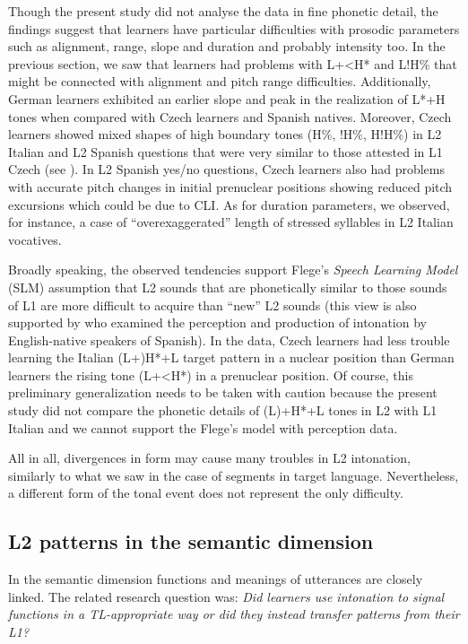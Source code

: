 Though the present study did not analyse the data in fine phonetic detail, the findings suggest that learners have particular difficulties with prosodic parameters such as alignment, range, slope and duration and probably intensity too. In the previous section, we saw that learners had problems with L+<H* and L!H\% that might be connected with alignment and pitch range difficulties. Additionally, German learners exhibited an earlier slope and peak in the realization of L*+H tones when compared with Czech learners and Spanish natives. Moreover, Czech learners showed mixed shapes of high boundary tones (H\%, !H\%, H!H\%) in L2 Italian and L2 Spanish questions that were very similar to those attested in L1 Czech (see \citealt{PeškováEtAl2018}). In L2 Spanish yes/no questions, Czech learners also had problems with accurate pitch changes in initial prenuclear positions showing reduced pitch excursions which could be due to CLI. As for duration parameters, we observed, for instance, a case of “overexaggerated” length of stressed syllables in L2 Italian vocatives.



Broadly speaking, the observed tendencies support Flege’s \textit{Speech Learning Model} (SLM) assumption that L2 sounds that are phonetically similar to those sounds of L1 are more difficult to acquire than “new” L2 sounds (this view is also supported by \citealt{Zárate-Sández2015} who examined the perception and production of intonation by English-native speakers of Spanish). In the data, Czech learners had less trouble learning the Italian (L+)H*+L target pattern in a nuclear position than German learners the rising tone (L+<H*) in a prenuclear position. Of course, this preliminary generalization needs to be taken with caution because the present study did not compare the phonetic details of (L)+H*+L tones in L2 with L1 Italian and we cannot support the Flege’s model with perception data.



All in all, divergences in form may cause many troubles in L2 intonation, similarly to what we saw in the case of segments in target language. Nevertheless, a different form of the tonal event does not represent the only difficulty.


\subsection{L2 patterns in the semantic dimension}\label{sec:5.3.3}

In the semantic dimension functions and meanings of utterances are closely linked. The related research question was: \textit{Did learners use intonation to signal functions in a TL-appropriate way or did they instead transfer patterns from their L1?}


